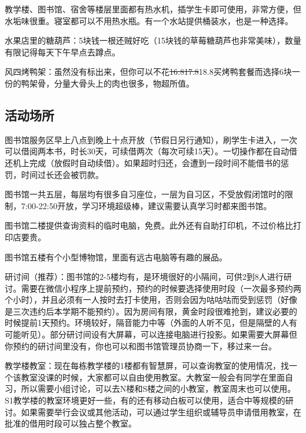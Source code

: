 
教学楼、图书馆、宿舍等楼层里面都有热水机，插学生卡即可使用，非常方便，但水垢味很重。寝室都可以不用热水瓶。有一个水站提供桶装水，也是一种选择。


水果店里的糖葫芦：5块钱一根还贼好吃（15块钱的草莓糖葫芦也非常美味），数量有限记得每天下午早点去蹲点。

风四烤鸭架：虽然没有标出来，但你可以不花\sout{16.8}\sout{17.8}18.8买烤鸭套餐而选择6块一份的鸭架骨，分量大骨头上的肉也很多，物超所值。

\subsection{活动场所}


图书馆服务区早上八点到晚上十点开放（节假日另行通知），刷学生卡进入，一次可以借阅两本书，时长30天，可续借两次（每次可续15天）。一切操作都在自动借还机上完成（放假时自动续借）。如果超时归还，会遭到一段时间不能借书的惩罚，时间过长还会被罚款。

图书馆一共五层，每层均有很多自习座位，一层为自习区，不受放假闭馆时的限制，7:00-22:50开放，学习环境超级棒，建议需要认真学习时都来图书馆。

图书馆二楼提供查询资料的临时电脑，免费。此外还有自助打印机，不过价格比打印店要贵。

图书馆五楼有个小型博物馆，里面有远古电脑等有趣的展品。


研讨间（推荐）：图书馆的2-5楼均有，是环境很好的小隔间，可供2到8人进行研讨。需要在微信小程序上提前预约，预约的时候要选择使用时段（一次最多预约两个小时），并且必须有一人按时去打卡使用，否则会因为咕咕咕而受到惩罚（好像是三次违约后本学期不能预约）。因为房间有限，黄金时段很难抢到，建议必要的时候提前1天预约。环境较好，隔音能力中等（外面的人听不见，但是隔壁的人有可能听见）。部分研讨间设有大屏幕，可以连接电脑进行投影。如果需要大屏幕但你预约的研讨间里没有，你也可以和图书馆管理员协商一下，移过来一台。

教学楼教室：现在每栋教学楼的1楼都有智慧屏，可以查询教室的使用情况，找一个该教室没课的时候，大家都可以自由使用教室。大教室一般会有同学在里面自习，所以需要小组讨论，可以去N楼和S楼之间的小教室，教室周末也可以使用。S1教学楼的教室环境更好一些，有的还有移动白板可以使用，适合中等规模的研讨。如果需要举行会议或其他活动，可以通过学生组织或辅导员申请借用教室，在批准的借用时段可以独占整个教室。

